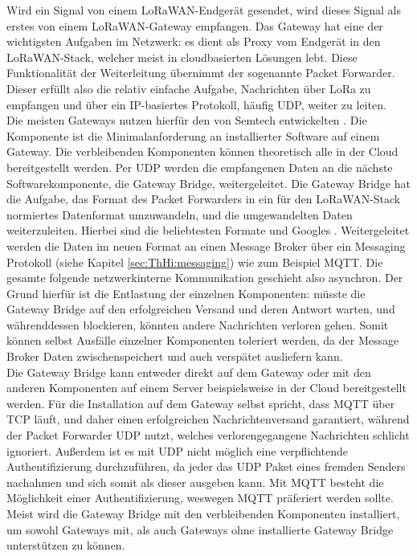 Wird ein Signal von einem LoRaWAN-Endgerät gesendet, wird dieses Signal als erstes von einem LoRaWAN-Gateway empfangen. Das Gateway hat eine der wichtigsten Aufgaben im Netzwerk: es dient als Proxy vom Endgerät in den LoRaWAN-Stack, welcher meist in cloudbasierten Lösungen lebt. Diese Funktionalität der Weiterleitung übernimmt der sogenannte Packet Forwarder. Dieser erfüllt also die relativ einfache Aufgabe, Nachrichten über LoRa zu empfangen und über ein IP-basiertes Protokoll, häufig UDP, weiter zu leiten.\\ Die meisten Gateways nutzen hierfür den von Semtech entwickelten . Die Komponente ist die Minimalanforderung an installierter Software auf einem Gateway. Die verbleibenden Komponenten können theoretisch alle in der Cloud bereitgestellt werden. Per UDP werden die empfangenen Daten an die nächste Softwarekomponente, die Gateway Bridge, weitergeleitet.
Die Gateway Bridge hat die Aufgabe, das Format des Packet Forwarders in ein für den LoRaWAN-Stack normiertes Datenformat umzuwandeln, und die umgewandelten Daten weiterzuleiten. Hierbei sind die beliebtesten Formate  und Googles . Weitergeleitet werden die Daten im neuen Format an einen Message Broker über ein Messaging Protokoll (siehe Kapitel \ref{sec:ThHi:messaging}) wie zum Beispiel MQTT. Die gesamte folgende netzwerkinterne Kommunikation geschieht also asynchron. Der Grund hierfür ist die Entlastung der einzelnen Komponenten: müsste die Gateway Bridge auf den erfolgreichen Versand und deren Antwort warten, und währenddessen blockieren, könnten andere Nachrichten verloren gehen. Somit können selbst Ausfälle einzelner Komponenten toleriert werden, da der Message Broker Daten zwischenspeichert und auch verspätet ausliefern kann.\\
Die Gateway Bridge kann entweder direkt auf dem Gateway oder mit den anderen Komponenten auf einem Server beispielsweise in der Cloud bereitgestellt werden. Für die Installation auf dem Gateway selbst spricht, dass MQTT über TCP läuft, und daher einen erfolgreichen Nachrichtenversand garantiert, während der Packet Forwarder UDP nutzt, welches verlorengegangene Nachrichten schlicht ignoriert. Außerdem ist es mit UDP nicht möglich eine verpflichtende Authentifizierung durchzuführen, da jeder das UDP Paket eines fremden Senders nachahmen und sich somit als dieser ausgeben kann. Mit MQTT besteht die Möglichkeit einer Authentifizierung, weswegen MQTT präferiert werden sollte. Meist wird die Gateway Bridge mit den verbleibenden Komponenten installiert, um sowohl Gateways mit, als auch Gateways ohne installierte Gateway Bridge unterstützen zu können. \\
